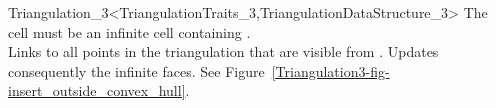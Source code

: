 \begin{ccRefClass}{Triangulation_3<TriangulationTraits_3,TriangulationDataStructure_3>}
{%
The cell  must be an infinite cell containing .\\
Links  to all  points in the triangulation that are visible from
. Updates consequently the infinite faces. See
Figure~\ref{Triangulation3-fig-insert_outside_convex_hull}.
}


\end{ccRefClass}
